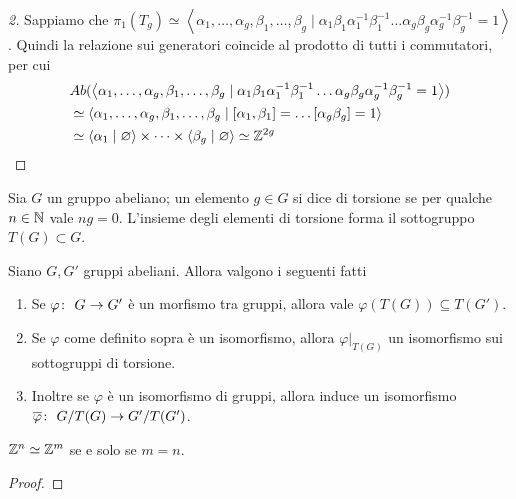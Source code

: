 \begin{proof}[2]
	Sappiamo che $\pi_1(T_g) \simeq \left\langle \alpha_1, \dots, \alpha_g, \beta_1, \dots, \beta_g \mid \alpha_1 \beta_1\alpha^{-1}_1\beta^{-1}_1 \dots \alpha_g \beta_g\alpha^{-1}_g\beta^{-1}_g = 1\right\rangle$. Quindi la relazione sui generatori coincide al prodotto di tutti i commutatori, per cui 
	\begin{equation}
	\begin{aligned}
		& Ab(\left\langle \alpha_1, \dots, \alpha_g, \beta_1, \dots, \beta_g \mid \alpha_1 \beta_1\alpha^{-1}_1\beta^{-1}_1 \dots \alpha_g \beta_g\alpha^{-1}_g\beta^{-1}_g = 1\right\rangle) \\ & \simeq \left\langle \alpha_1, \dots, \alpha_g, \beta_1, \dots, \beta_g \mid \left[\alpha_1, \beta_1\right] = \dots \left[\alpha_g \beta_g\right] = 1\right\rangle\\
		& \simeq \left\langle \alpha_1 \mid \varnothing \right\rangle \times \dots \times \left\langle\beta_g \mid \varnothing \right\rangle \simeq \mathbb{Z}^{2g}
	\end{aligned}
	\end{equation}
\end{proof}

\begin{definition}
	Sia $G$ un gruppo abeliano; un elemento $g \in G$ si dice di torsione se per qualche $n \in \mathbb{N}$ vale $ng = 0$. L'insieme degli elementi di torsione forma il sottogruppo $T(G) \subset G$.
\end{definition}

\begin{lemma}
	Siano $G, G'$ gruppi abeliani. Allora valgono i seguenti fatti
	\begin{enumerate}
		\item Se $\varphi \colon\ G \rightarrow G'$ è un morfismo tra gruppi, allora vale $\varphi(T(G)) \subseteq T(G')$.
		\item Se $\varphi$ come definito sopra è un isomorfismo, allora $\varphi|_{T(G)}$ un isomorfismo sui sottogruppi di torsione.
		\item Inoltre se $\varphi$ è un isomorfismo di gruppi, allora induce un isomorfismo $\overline{\varphi} \colon\ G/T(G) \rightarrow G'/T(G')$.  
	\end{enumerate}
\end{lemma}

\begin{proposition}
	$\mathbb{Z}^n \simeq \mathbb{Z}^m$ se e solo se $m = n$. 
\end{proposition}
\begin{proof}
\end{proof}

